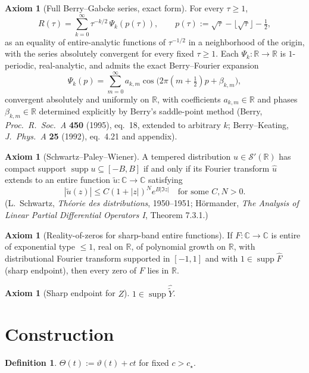 \documentclass[11pt]{article}
\theoremstyle{definition}
\newtheorem{definition}[theorem]{Definition}
\newtheorem{axiom}[theorem]{Axiom}
\newcommand{\R}{\mathbb{R}}
\newcommand{\C}{\mathbb{C}}
\newcommand{\supp}{\operatorname{supp}}
\begin{document}
\begin{axiom}[Full Berry--Gabcke series, exact form]\label{ax:Berry}
For every \(\tau\ge 1\),
\[
R(\tau)=\sum_{k=0}^\infty \tau^{-k/2}\,\Psi_k(p(\tau)),\qquad p(\tau):=\sqrt\tau-\lfloor\sqrt\tau\rfloor-\tfrac12,
\]
as an equality of entire-analytic functions of \(\tau^{-1/2}\) in a neighborhood of the origin, with the series absolutely convergent for every fixed \(\tau\ge 1\). Each \(\Psi_k:\R\to\R\) is \(1\)-periodic, real-analytic, and admits the exact Berry--Fourier expansion
\[
\Psi_k(p)=\sum_{m=0}^\infty a_{k,m}\cos\bigl(2\pi(m+\tfrac12)p+\beta_{k,m}\bigr),
\]
convergent absolutely and uniformly on \(\R\), with coefficients \(a_{k,m}\in\R\) and phases \(\beta_{k,m}\in\R\) determined explicitly by Berry's saddle-point method (Berry, \emph{Proc.\ R.\ Soc.\ A} \textbf{450} (1995), eq.~18, extended to arbitrary \(k\); Berry--Keating, \emph{J.\ Phys.\ A} \textbf{25} (1992), eq.~4.21 and appendix).
\end{axiom}

\begin{axiom}[Schwartz--Paley--Wiener]\label{ax:SPW}
A tempered distribution \(u\in\mathcal S'(\R)\) has compact support \(\supp u\subseteq[-B,B]\) if and only if its Fourier transform \(\hat u\) extends to an entire function \(\tilde u:\C\to\C\) satisfying
\[
|\tilde u(z)|\le C(1+|z|)^N e^{B|\Im z|}\quad\text{for some }C,N>0.
\]
(L.\ Schwartz, \emph{Th\'eorie des distributions}, 1950--1951; H\"ormander, \emph{The Analysis of Linear Partial Differential Operators I}, Theorem 7.3.1.)
\end{axiom}

\begin{axiom}[Reality-of-zeros for sharp-band entire functions]\label{ax:ALP}
If \(F:\C\to\C\) is entire of exponential type \(\le 1\), real on \(\R\), of polynomial growth on \(\R\), with distributional Fourier transform supported in \([-1,1]\) and with \(1\in\supp\hat F\) (sharp endpoint), then every zero of \(F\) lies in \(\R\).
\end{axiom}

\begin{axiom}[Sharp endpoint for \(Z\)]\label{ax:sharp}
\(1\in\supp\hat{\tilde Y}\).
\end{axiom}

\section{Construction}

\begin{definition}\label{def:Theta}
\(\Theta(t):=\vartheta(t)+ct\) for fixed \(c>c_\star\).
\end{definition}
\end{document}
